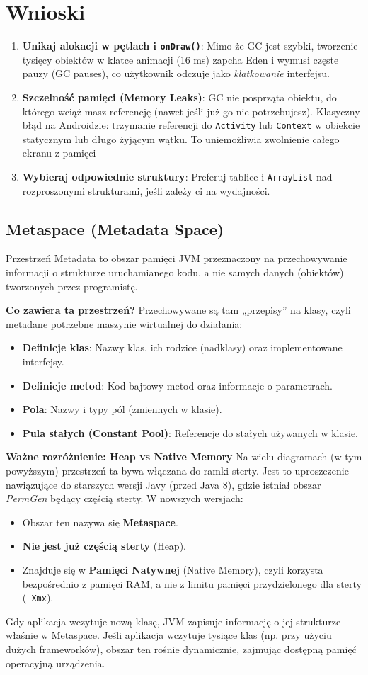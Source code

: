 \section*{Wnioski}

\begin{enumerate}
    \item \textbf{Unikaj alokacji w pętlach i \texttt{onDraw()}}: Mimo że GC jest szybki, tworzenie tysięcy obiektów w klatce animacji (16 ms) zapcha Eden i wymusi częste pauzy (GC pauses), co użytkownik odczuje jako \textit{klatkowanie} interfejsu.
    \item \textbf{Szczelność pamięci (Memory Leaks)}: GC nie posprząta obiektu, do którego wciąż masz referencję (nawet jeśli już go nie potrzebujesz). Klasyczny błąd na Androidzie: trzymanie referencji do \texttt{Activity} lub \texttt{Context} w obiekcie statycznym lub długo żyjącym wątku. To uniemożliwia zwolnienie całego ekranu z pamięci
    \item \textbf{Wybieraj odpowiednie struktury}: Preferuj tablice i \texttt{ArrayList} nad rozproszonymi strukturami, jeśli zależy ci na wydajności.
\end{enumerate}

\subsection*{Metaspace (Metadata Space)}
Przestrzeń Metadata to obszar pamięci JVM przeznaczony na przechowywanie informacji o strukturze uruchamianego kodu, a nie samych danych (obiektów) tworzonych przez programistę.

\textbf{Co zawiera ta przestrzeń?}
Przechowywane są tam „przepisy” na klasy, czyli metadane potrzebne maszynie wirtualnej do działania:
\begin{itemize}
    \item \textbf{Definicje klas}: Nazwy klas, ich rodzice (nadklasy) oraz implementowane interfejsy.
    \item \textbf{Definicje metod}: Kod bajtowy metod oraz informacje o parametrach.
    \item \textbf{Pola}: Nazwy i typy pól (zmiennych w klasie).
    \item \textbf{Pula stałych (Constant Pool)}: Referencje do stałych używanych w klasie.
\end{itemize}

\textbf{Ważne rozróżnienie: Heap vs Native Memory}
Na wielu diagramach (w tym powyższym) przestrzeń ta bywa włączana do ramki sterty. Jest to uproszczenie nawiązujące do starszych wersji Javy (przed Java 8), gdzie istniał obszar \textit{PermGen} będący częścią sterty. W nowszych wersjach:
\begin{itemize}
    \item Obszar ten nazywa się \textbf{Metaspace}.
    \item \textbf{Nie jest już częścią sterty} (Heap).
    \item Znajduje się w \textbf{Pamięci Natywnej} (Native Memory), czyli korzysta bezpośrednio z pamięci RAM, a nie z limitu pamięci przydzielonego dla sterty (\texttt{-Xmx}).
\end{itemize}

Gdy aplikacja wczytuje nową klasę, JVM zapisuje informację o jej strukturze właśnie w Metaspace. Jeśli aplikacja wczytuje tysiące klas (np. przy użyciu dużych frameworków), obszar ten rośnie dynamicznie, zajmując dostępną pamięć operacyjną urządzenia.
